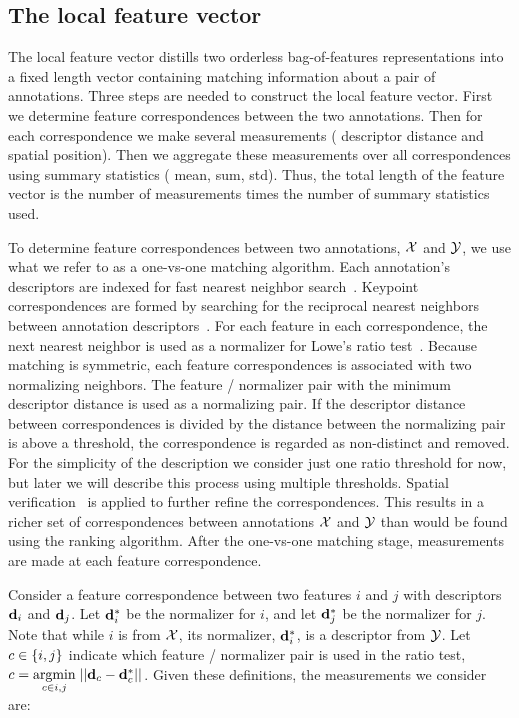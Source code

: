\subsection{The local feature vector}
The local feature vector distills two orderless bag-of-features representations into a fixed length vector
  containing matching information about a pair of annotations.
Three steps are needed to construct the local feature vector.
First we determine feature correspondences between the two annotations.
Then for each correspondence we make several measurements (\eg{} descriptor distance and spatial position).
Then we aggregate these measurements over all correspondences using summary statistics (\eg{} mean, sum, std).
Thus, the total length of the feature vector is the number of measurements times the number of summary statistics
  used.

To determine feature correspondences between two annotations, $\mathcal{X}$ and $\mathcal{Y}$, we use what we refer to as a
  one-vs-one matching algorithm.
Each annotation's descriptors are indexed for fast nearest neighbor search~\cite{muja_fast_2009}.
Keypoint correspondences are formed by searching for the reciprocal nearest neighbors between annotation
  descriptors~\cite{qin_hello_2011}.
For each feature in each correspondence, the next nearest neighbor is used as a normalizer for Lowe's ratio
  test~\cite{lowe_distinctive_2004}.
Because matching is symmetric, each feature correspondences is associated with two normalizing neighbors.
The feature / normalizer pair with the minimum descriptor distance is used as a normalizing pair.
If the descriptor distance between correspondences is divided by the distance between the normalizing pair is
  above a threshold, the correspondence is regarded as non-distinct and removed.
For the simplicity of the description we consider just one ratio threshold for now, but later we will describe
  this process using multiple thresholds.
Spatial verification~\cite{philbin_object_2007} is applied to further refine the correspondences.
This results in a richer set of correspondences between annotations $\mathcal{X}$ and $\mathcal{Y}$ than would be found using
  the ranking algorithm.
After the one-vs-one matching stage, measurements are made at each feature correspondence.

Consider a feature correspondence between two features $i$ and $j$ with descriptors $\mathbf{d}_i$ and $\mathbf{d}_j$.
Let $\mathbf{d}^{*}_i$ be the normalizer for $i$, and let $\mathbf{d}^{*}_j$ be the normalizer for $j$.
Note that while $i$ is from $\mathcal{X}$, its normalizer, $\mathbf{d}^{*}_i$, is a descriptor from $\mathcal{Y}$.
Let $c \in \left\{i, j\right\}$ indicate which feature / normalizer pair is used in the ratio test, %
$c = \underset{c \in {i, j}}{\operatorname{argmin}}\;{||\mathbf{d}_c - \mathbf{d}^{*}_c||_{}}$.
Given these definitions, the measurements we consider are:

